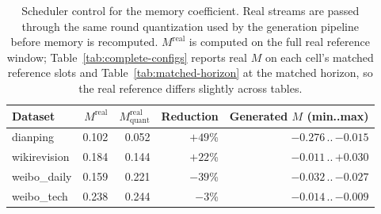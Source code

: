 \begin{table}[h]
\caption{Scheduler control for the memory coefficient. Real streams are passed through the same round quantization used by the generation pipeline before memory is recomputed. $M^{\mathrm{real}}$ is computed on the full real reference window; Table~\ref{tab:complete-configs} reports real $M$ on each cell's matched reference slots and Table~\ref{tab:matched-horizon} at the matched horizon, so the real reference differs slightly across tables.}
\label{tab:scheduler-control}
\centering\small
\begin{tabular}{lrrrr}
\toprule
Dataset & $M^{\mathrm{real}}$ & $M^{\mathrm{real}}_{\mathrm{quant}}$ & Reduction & Generated $M$ (min..max) \\
\midrule
dianping & 0.102 & 0.052 & $+49$\% & $-0.276$\,..\,$-0.015$ \\
wikirevision & 0.184 & 0.144 & $+22$\% & $-0.011$\,..\,$+0.030$ \\
weibo\_daily & 0.159 & 0.221 & $-39$\% & $-0.032$\,..\,$-0.027$ \\
weibo\_tech & 0.238 & 0.244 & $-3$\% & $-0.014$\,..\,$-0.009$ \\
\bottomrule
\end{tabular}
\end{table}
